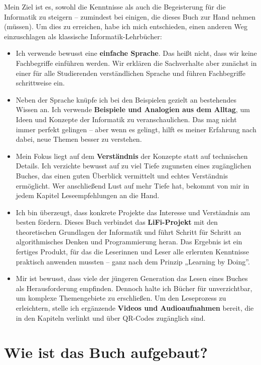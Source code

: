 \documentclass[
  letterpaper,
  DIV=11]{scrreprt}
\begin{document}
Mein Ziel ist es, sowohl die Kenntnisse als auch die Begeisterung für
die Informatik zu steigern -- zumindest bei einigen, die dieses Buch zur
Hand nehmen (müssen). Um dies zu erreichen, habe ich mich entschieden,
einen anderen Weg einzuschlagen als klassische Informatik-Lehrbücher:

\begin{itemize}
\item
  Ich verwende bewusst eine \textbf{einfache Sprache}. Das heißt nicht,
  dass wir keine Fachbegriffe einführen werden. Wir erklären die
  Sachverhalte aber zunächst in einer für alle Studierenden
  verständlichen Sprache und führen Fachbegriffe schrittweise ein.
\item
  Neben der Sprache knüpfe ich bei den Beispielen gezielt an bestehendes
  Wissen an. Ich verwende \textbf{Beispiele und Analogien aus dem
  Alltag}, um Ideen und Konzepte der Informatik zu veranschaulichen. Das
  mag nicht immer perfekt gelingen -- aber wenn es gelingt, hilft es
  meiner Erfahrung nach dabei, neue Themen besser zu verstehen.
\item
  Mein Fokus liegt auf dem \textbf{Verständnis} der Konzepte statt auf
  technischen Details. Ich verzichte bewusst auf zu viel Tiefe zugunsten
  eines zugänglichen Buches, das einen guten Überblick vermittelt und
  echtes Verständnis ermöglicht. Wer anschließend Lust auf mehr Tiefe
  hat, bekommt von mir in jedem Kapitel Leseempfehlungen an die Hand.
\item
  Ich bin überzeugt, dass konkrete Projekte das Interesse und
  Verständnis am besten fördern. Dieses Buch verbindet das
  \textbf{LiFi-Projekt} mit den theoretischen Grundlagen der Informatik
  und führt Schritt für Schritt an algorithmisches Denken und
  Programmierung heran. Das Ergebnis ist ein fertiges Produkt, für das
  die Leserinnen und Leser alle erlernten Kenntnisse praktisch anwenden
  mussten -- ganz nach dem Prinzip „Learning by Doing''.
\item
  Mir ist bewusst, dass viele der jüngeren Generation das Lesen eines
  Buches als Herausforderung empfinden. Dennoch halte ich Bücher für
  unverzichtbar, um komplexe Themengebiete zu erschließen. Um den
  Leseprozess zu erleichtern, stelle ich ergänzende \textbf{Videos und
  Audioaufnahmen} bereit, die in den Kapiteln verlinkt und über QR-Codes
  zugänglich sind.
\end{itemize}

\section*{Wie ist das Buch aufgebaut?}\label{wie-ist-das-buch-aufgebaut}
\end{document}

